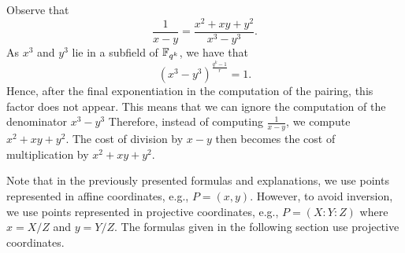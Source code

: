Observe that
$$ \frac{1}{x-y} = \frac{x^2 + xy + y^2}{x^3 - y^3}. $$
As $x^3$ and $y^3$ lie in a subfield of $\mathbb{F}_{q^k}$, we have that
\[(x^{3} - y^{3})^{\frac{q^{k}-1}{r}} = 1.\]
Hence, after the final exponentiation in the computation of the pairing, this factor does not appear.
This means that we can ignore the computation of the denominator $x^3 - y^3$
Therefore, instead of computing $\frac{1}{x-y}$, we compute $x^2 + xy + y^2$.
The cost of division by $x - y$ then becomes the cost of multiplication by $x^2 + xy + y^2$.


Note that in the previously presented formulas and explanations,
we use points represented in affine coordinates,
e.g., $P = (x,y)$.
However, to avoid inversion,
we use points represented in projective coordinates,
e.g., $P = (X : Y : Z)$ where $x = X/Z$ and $y = Y/Z$.
The formulas given in the following section use projective coordinates.
